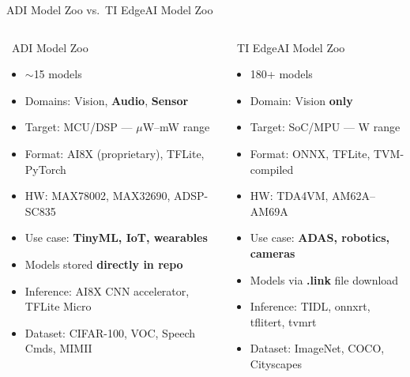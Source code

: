 \documentclass[aspectratio=169,10pt]{beamer}
\begin{document}
\begin{frame}{ADI Model Zoo vs.\ TI EdgeAI Model Zoo}
  \begin{columns}[T]
    \begin{block}{\textcolor{ADIBlue}{\faChartBar\ ADI Model Zoo}}
      {\small
      \begin{itemize}
        \item \alert{$\sim$15} models
        \item Domains: Vision, \textbf{Audio}, \textbf{Sensor}
        \item Target: MCU/DSP — \alert{$\mu$W–mW} range
        \item Format: AI8X (proprietary), TFLite, PyTorch
        \item HW: MAX78002, MAX32690, ADSP-SC835
        \item Use case: \textbf{TinyML, IoT, wearables}
        \item Models stored \textbf{directly in repo}
        \item Inference: AI8X CNN accelerator, TFLite Micro
        \item Dataset: CIFAR-100, VOC, Speech Cmds, MIMII
      \end{itemize}}
    \end{block}
    \begin{block}{\textcolor{ADIGray}{\faChartBar\ TI EdgeAI Model Zoo}}
      {\small
      \begin{itemize}
        \item \alert{180+} models
        \item Domain: Vision \textbf{only}
        \item Target: SoC/MPU — \alert{W} range
        \item Format: ONNX, TFLite, TVM-compiled
        \item HW: TDA4VM, AM62A–AM69A
        \item Use case: \textbf{ADAS, robotics, cameras}
        \item Models via \textbf{.link} file download
        \item Inference: TIDL, onnxrt, tflitert, tvmrt
        \item Dataset: ImageNet, COCO, Cityscapes
      \end{itemize}}
    \end{block}
  \end{columns}


\end{frame}
\end{document}
